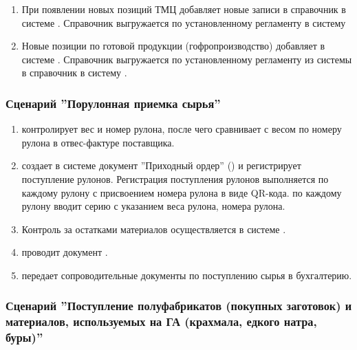 \begin{enumerate}
\item При появлении новых позиций ТМЦ \kladovshik  добавляет новые записи в справочник  в системе \erp. Справочник выгружается по установленному регламенту в систему \gofro 
\item Новые позиции по готовой продукции (гофропроизводство) добавляет \manager в системе \gofro. Справочник выгружается по установленному регламенту из системы \gofro в справочник  в систему \gofro.
\end{enumerate}



\subsubsection{Сценарий ''Порулонная приемка сырья''}
\label{bp:storage_5}

\begin{enumerate}
\item \kladovshik контролирует вес и номер рулона, после чего сравнивает с весом по номеру рулона в отвес-фактуре поставщика.

\item \kladovshik создает в системе \erp документ ”Приходный ордер” ()
и регистрирует поступление рулонов.
Регистрация поступления рулонов выполняется по каждому рулону с присвоением номера рулона в виде QR-кода.
\kladovshik по каждому рулону  вводит серию с указанием веса рулона, номера рулона. 

\item Контроль за остатками материалов осуществляется в системе \erp.

\item \kladovshik проводит документ .
\item \kladovshik передает сопроводительные документы по поступлению сырья в бухгалтерию.


\end{enumerate}


\subsubsection{Сценарий ''Поступление полуфабрикатов (покупных заготовок) и материалов, используемых на ГА (крахмала, едкого натра, буры)'' }
\label{bp:storage_51}

